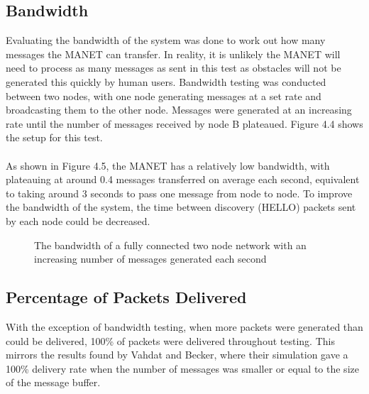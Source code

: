 \documentclass[12pt,a4paper]{report}
\makeatletter
\newenvironment{figurehere}
  {\def\@captype{figure}}
  {}
\makeatother
\begin{document}
\subsection{Bandwidth}
Evaluating the bandwidth of the system was done to work out how many messages the MANET can transfer. In reality, it is unlikely the MANET will need to process as many messages as sent in this test as obstacles will not be generated this quickly by human users. Bandwidth testing was conducted between two nodes, with one node generating messages at a set rate and broadcasting them to the other node. Messages were generated at an increasing rate until the number of messages received by node B plateaued. Figure 4.4 shows the setup for this test. \\ \\
As shown in Figure 4.5, the MANET has a relatively low bandwidth, with plateauing at around 0.4 messages transferred on average each second, equivalent to taking around 3 seconds to pass one message from node to node. To improve the bandwidth of the system, the time between discovery (HELLO) packets sent by each node could be decreased. 
\begin{figurehere}
\begin{center}
\end{center}
\caption{The network used for bandwidth testing}
\end{figurehere}
\begin{figure}[h]
\begin{center}

\end{center}
\caption{The bandwidth of a fully connected two node network with an increasing number of messages generated each second}
\end{figure}

\subsection{Percentage of Packets Delivered}
With the exception of bandwidth testing, when more packets were generated than could be delivered, 100\% of packets were delivered throughout testing. This mirrors the results found by Vahdat and Becker, where their simulation gave a 100\% delivery rate when the number of messages was smaller or equal to the size of the message buffer.\\
\end{document}
